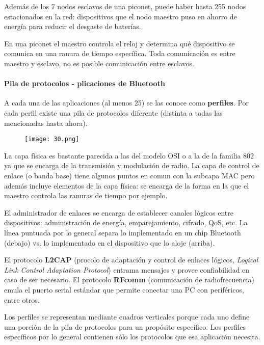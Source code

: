 \documentclass{book}
\begin{document}
	Además de los 7 nodos esclavos de una piconet, puede haber hasta 255 nodos estacionados en la red: dispositivos que el nodo maestro puso en ahorro de energía para reducir el desgaste de baterías.
	
	\vspace{3mm}
	En una piconet el maestro controla el reloj y determina qué dispositivo se comunica en una ranura de tiempo específica. Toda comunicación es entre maestro y esclavo, no es posible comunicación entre esclavos.
	
	\paragraph{Pila de protocolos - plicaciones de Bluetooth}
	A cada una de las aplicaciones (al menos 25) se las conoce como \textbf{perfiles}. Por cada perfil existe una pila de protocolos diferente (distinta a todas las mencionadas hasta ahora).
	
	\begin{figure}[H]
		\centering
		\texttt{[image: 30.png]}
	\end{figure}
	
	La capa física es bastante parecida a las del modelo OSI o a la de la familia 802 ya que se encarga de la transmisión y modulación de radio. La capa de control de enlace (o banda base) tiene algunos puntos en comun con la subcapa MAC pero además incluye elementos de la capa física: se encarga de la forma en la que el maestro controla las ranuras de tiempo por ejemplo.
	
	\vspace{3mm}
	El administrador de enlaces se encarga de establecer canales lógicos entre dispositivos: administración de energía, emparejamiento, cifrado, QoS, etc. La línea puntuada por lo general separa lo implementado en un chip Bluetooth (debajo) vs. lo implementado en el dispositivo que lo aloje (arriba).
	
	\vspace{3mm}
	El protocolo \textbf{L2CAP} (procolo de adaptación y control de enlaces lógicos, \textit{Logical Link Control Adaptation Protocol}) entrama mensajes y provee confiabilidad en caso de ser necesario. El protocolo \textbf{RFcomm} (comunicación de radiofrecuencia) emula el puerto serial estándar que permite conectar una PC con periféricos, entre otros.
	
	\begin{center}
		Los perfiles se representan mediante cuadros verticales porque cada uno define una porción de la pila de protocolos para un propósito específico. Los perfiles específicos por lo general contienen sólo los protocolos que esa aplicación necesita.
	\end{center}
	
\end{document}

